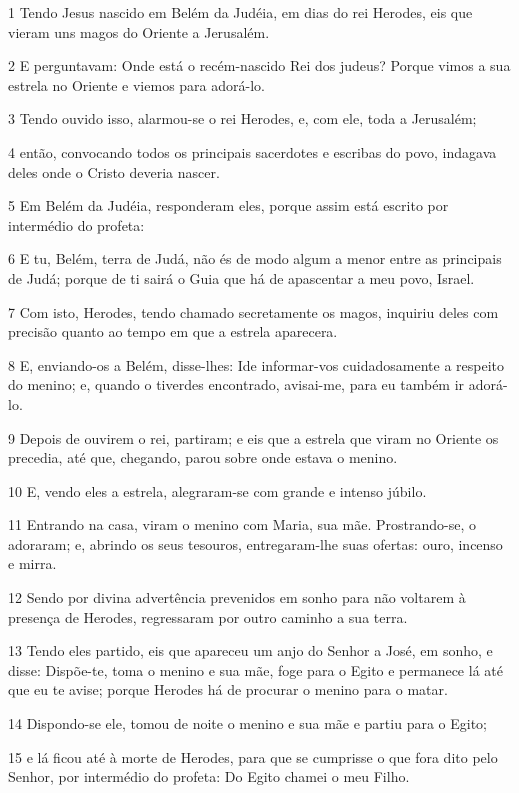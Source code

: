 \par 1 Tendo Jesus nascido em Belém da Judéia, em dias do rei Herodes, eis que vieram uns magos do Oriente a Jerusalém.
\par 2 E perguntavam: Onde está o recém-nascido Rei dos judeus? Porque vimos a sua estrela no Oriente e viemos para adorá-lo.
\par 3 Tendo ouvido isso, alarmou-se o rei Herodes, e, com ele, toda a Jerusalém;
\par 4 então, convocando todos os principais sacerdotes e escribas do povo, indagava deles onde o Cristo deveria nascer.
\par 5 Em Belém da Judéia, responderam eles, porque assim está escrito por intermédio do profeta:
\par 6 E tu, Belém, terra de Judá, não és de modo algum a menor entre as principais de Judá; porque de ti sairá o Guia que há de apascentar a meu povo, Israel.
\par 7 Com isto, Herodes, tendo chamado secretamente os magos, inquiriu deles com precisão quanto ao tempo em que a estrela aparecera.
\par 8 E, enviando-os a Belém, disse-lhes: Ide informar-vos cuidadosamente a respeito do menino; e, quando o tiverdes encontrado, avisai-me, para eu também ir adorá-lo.
\par 9 Depois de ouvirem o rei, partiram; e eis que a estrela que viram no Oriente os precedia, até que, chegando, parou sobre onde estava o menino.
\par 10 E, vendo eles a estrela, alegraram-se com grande e intenso júbilo.
\par 11 Entrando na casa, viram o menino com Maria, sua mãe. Prostrando-se, o adoraram; e, abrindo os seus tesouros, entregaram-lhe suas ofertas: ouro, incenso e mirra.
\par 12 Sendo por divina advertência prevenidos em sonho para não voltarem à presença de Herodes, regressaram por outro caminho a sua terra.
\par 13 Tendo eles partido, eis que apareceu um anjo do Senhor a José, em sonho, e disse: Dispõe-te, toma o menino e sua mãe, foge para o Egito e permanece lá até que eu te avise; porque Herodes há de procurar o menino para o matar.
\par 14 Dispondo-se ele, tomou de noite o menino e sua mãe e partiu para o Egito;
\par 15 e lá ficou até à morte de Herodes, para que se cumprisse o que fora dito pelo Senhor, por intermédio do profeta: Do Egito chamei o meu Filho.
